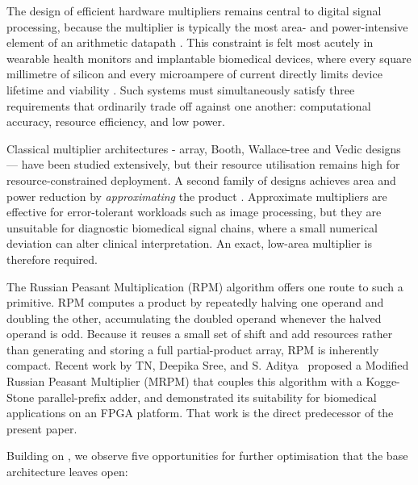 \documentclass[conference]{IEEEtran}
\begin{document}
The design of efficient hardware multipliers remains central to digital
signal processing, because the multiplier is typically the most
area- and power-intensive element of an arithmetic datapath
\cite{sharma,lotfabadi}. This constraint is felt most acutely in
wearable health monitors and implantable biomedical devices, where
every square millimetre of silicon and every microampere of current
directly limits device lifetime and viability \cite{ajay}. Such systems
must simultaneously satisfy three requirements that ordinarily trade
off against one another: computational accuracy, resource efficiency,
and low power.

Classical multiplier architectures - array, Booth, Wallace-tree and
Vedic designs \cite{phuse,prabhu,gokhale,bansal} --- have been studied
extensively, but their resource utilisation remains high for
resource-constrained deployment. A second family of designs achieves
area and power reduction by \emph{approximating} the product
\cite{khurshid,approx2025}. Approximate multipliers are effective for
error-tolerant workloads such as image processing, but they are
unsuitable for diagnostic biomedical signal chains, where a small
numerical deviation can alter clinical interpretation. An exact,
low-area multiplier is therefore required.

The Russian Peasant Multiplication (RPM) algorithm offers one route to
such a primitive. RPM computes a product by repeatedly halving one
operand and doubling the other, accumulating the doubled operand
whenever the halved operand is odd. Because it reuses a small set of
shift and add resources rather than generating and storing a full
partial-product array, RPM is inherently compact. Recent work by
TN, Deepika Sree, and S. Aditya~\cite{base} proposed a Modified Russian
Peasant Multiplier (MRPM) that couples this algorithm with a
Kogge-Stone parallel-prefix adder, and demonstrated its suitability for
biomedical applications on an FPGA platform. That work is the direct
predecessor of the present paper.

Building on \cite{base}, we observe five opportunities for further
optimisation that the base architecture leaves open:
\end{document}
